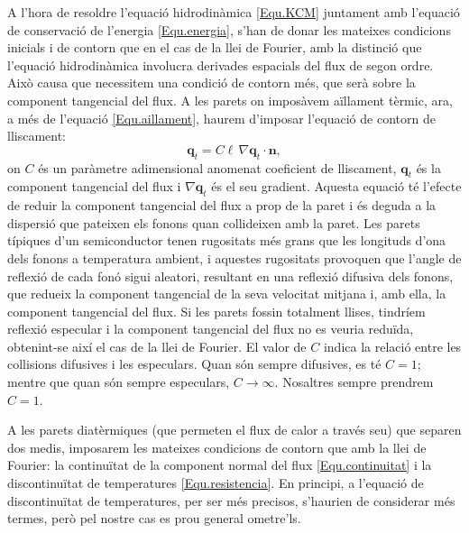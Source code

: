 \documentclass{article}
\begin{document}
A l'hora de resoldre l'equaci\'{o} hidrodin\`{a}mica \eqref{Equ.KCM} juntament amb l'equaci\'{o} de conservaci\'{o} de l'energia \eqref{Equ.energia}, s'han de donar les mateixes condicions inicials i de contorn que en el cas de la llei de Fourier, amb la distinci\'{o} que l'equaci\'{o} hidrodin\`{a}mica involucra derivades espacials del flux de segon ordre. Aix\`{o} causa que necessitem una condici\'{o} de contorn m\'{e}s, que ser\`{a} sobre la component tangencial del flux. A les parets on impos\`{a}vem a\"{i}llament t\`{e}rmic, ara, a m\'{e}s de l'equaci\'{o} \eqref{Equ.aillament}, haurem d'imposar l'equaci\'{o} de contorn de lliscament:
\begin{equation}\label{Equ.lliscament}
\boldsymbol{q}_t=C\ell\,\nabla\boldsymbol{q}_t\cdot\boldsymbol{n},
\end{equation}
on $C$ \'{e}s un par\`{a}metre adimensional anomenat coeficient de lliscament, $\boldsymbol{q}_t$ \'{e}s la component tangencial del flux i $\nabla\boldsymbol{q}_t$ \'{e}s el seu gradient. Aquesta equaci\'{o} t\'{e} l'efecte de reduir la component tangencial del flux a prop de la paret i \'{e}s deguda a la dispersi\'{o} que pateixen els fonons quan col\textperiodcentered lideixen amb la paret. Les parets t\'{i}piques d'un semiconductor tenen rugositats m\'{e}s grans que les longituds d'ona dels fonons a temperatura ambient, i aquestes rugositats provoquen que l'angle de reflexi\'{o} de cada fon\'{o} sigui aleatori, resultant en una reflexi\'{o} difusiva dels fonons, que redueix la component tangencial de la seva velocitat mitjana i, amb ella, la component tangencial del flux. Si les parets fossin totalment llises, tindr\'{i}em reflexi\'{o} especular i la component tangencial del flux no es veuria redu\"{i}da, obtenint-se aix\'{i} el cas de la llei de Fourier. El valor de $C$ indica la relaci\'{o} entre les col\textperiodcentered lisions difusives i les especulars. Quan s\'{o}n sempre difusives, es t\'{e} $C=1$; mentre que quan s\'{o}n sempre especulars, $C\to\infty$. Nosaltres sempre prendrem $C=1$.

A les parets diat\`{e}rmiques (que permeten el flux de calor a trav\'{e}s seu) que separen dos medis, imposarem les mateixes condicions de contorn que amb la llei de Fourier: la continu\"{i}tat de la component normal del flux \eqref{Equ.continuitat} i la discontinu\"{i}tat de temperatures \eqref{Equ.resistencia}. En principi, a l'equaci\'{o} de discontinu\"{i}tat de temperatures, per ser m\'{e}s precisos, s'haurien de considerar m\'{e}s termes, per\`{o} pel nostre cas es prou general ometre'ls.
\end{document}
